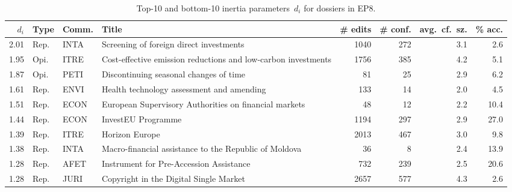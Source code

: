 
\begin{sidewaystable}
	\centering
	\caption{Top-10 and bottom-10 inertia parameters~$d_i$ for dossiers in EP8.}
	\label{lmp:tab:inertia_params}
	\begin{tabular}{rlllrrrr}
		\toprule
		$d_i$ & Type & Comm. & Title                                                         & \# edits & \# conf. & avg.\ cf.\ sz. & \% acc. \\
		\midrule

		2.01  & Rep. & INTA  & Screening of foreign direct investments                       & 1040     & 272      & 3.1            & 2.6     \\
		1.95  & Opi. & ITRE  & Cost-effective emission reductions and low-carbon investments & 1756     & 385      & 4.2            & 5.1     \\
		1.87  & Opi. & PETI  & Discontinuing seasonal changes of time                        & 81       & 25       & 2.9            & 6.2     \\
		1.61  & Rep. & ENVI  & Health technology assessment and amending                     & 133      & 14       & 2.0            & 4.5     \\
		1.51  & Rep. & ECON  & European Supervisory Authorities on financial markets         & 48       & 12       & 2.2            & 10.4    \\
		1.44  & Rep. & ECON  & InvestEU Programme                                            & 1194     & 297      & 2.9            & 27.0    \\
		1.39  & Rep. & ITRE  & Horizon Europe                                                & 2013     & 467      & 3.0            & 9.8     \\
		1.38  & Rep. & INTA  & Macro-financial assistance to the Republic of Moldova         & 36       & 8        & 2.4            & 13.9    \\
		1.28  & Rep. & AFET  & Instrument for Pre-Accession Assistance                       & 732      & 239      & 2.5            & 20.6    \\
		1.28  & Rep. & JURI  & Copyright in the Digital Single Market                        & 2657     & 577      & 4.3            & 2.6     \\


\end{tabular}
\end{sidewaystable}

